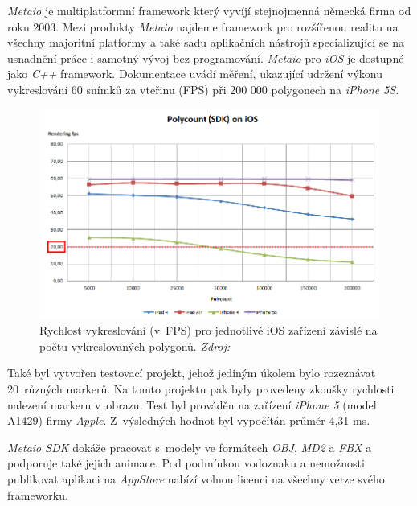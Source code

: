 \documentclass[twoside,12pt]{article}
\begin{document}
\textit{Metaio} je multiplatformní framework který vyvíjí stejnojmenná německá firma od roku 2003. Mezi produkty \textit{Metaio} najdeme framework pro rozšířenou realitu na všechny majoritní platformy a také sadu aplikačních nástrojů specializující se na usnadnění práce i samotný vývoj bez programování. \textit{Metaio} pro \textit{iOS} je dostupné jako \textit{C++} framework. 
Dokumentace uvádí měření, ukazující udržení výkonu vykreslování 60 snímků za vteřinu (FPS) při 200 000 polygonech na \textit{iPhone 5S}.

\begin{figure}[H]
\centering
    \includegraphics[width=424px, center]{images/Polycount_SDK_iOS_20fps.png}
\captionsetup{justification=centering}
    \caption{Rychlost vykreslování (v~FPS) pro jednotlivé iOS zařízení závislé na počtu vykreslovaných polygonů. \textit{Zdroj: \cite{metaio_benchmark}}}
    \label{metaio_benchmark}
\end{figure}

Také byl vytvořen testovací projekt, jehož jediným úkolem bylo rozeznávat 20~různých markerů. Na tomto projektu pak byly provedeny zkoušky rychlosti nalezení markeru v~obrazu. Test byl prováděn na zařízení \textit{iPhone 5} (model A1429) firmy \textit{Apple}. Z~výsledných hodnot byl vypočítán průměr 4,31 ms. 

\textit{Metaio SDK} dokáže pracovat s~modely ve formátech \textit{OBJ}, \textit{MD2} a \textit{FBX} a podporuje také jejich animace. Pod podmínkou vodoznaku a nemožnosti publikovat aplikaci na \textit{AppStore} nabízí volnou licenci na všechny verze svého frameworku. 
\end{document}
